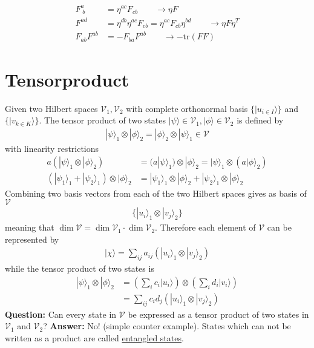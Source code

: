 \documentclass[../main.tex]{subfiles}
\begin{document}
\begin{align}
F^a_{\;b}&=\eta^{ac}F_{cb}\qquad\rightarrow \eta F\\
F^{ad}&=\eta^{db}\eta^{ac}F_{cb}=\eta^{ac}F_{cb}\eta^{bd}\qquad\rightarrow \eta F\eta^T\\
F_{ab}F^{ab}&=-F_{ba}F^{ab}\qquad\rightarrow-\text{tr}(F F)
\end{align}


\section{Tensorproduct}
Given two Hilbert spaces $\mathcal{V}_1, \mathcal{V}_2$ with complete orthonormal basis $\{|u_{i\in I}\rangle\}$ and $\{|v_{k\in K}\rangle\}$. The tensor product of two states $|\psi\rangle\in\mathcal{V}_1, |\phi\rangle\in\mathcal{V}_2$
is defined by
\begin{align}
|\psi\rangle_1 \otimes |\phi\rangle_2= |\phi\rangle_2 \otimes |\psi\rangle_1\in \mathcal{V}
\end{align}
with linearity restrictions
\begin{align}
a(|\psi\rangle_1 \otimes |\phi\rangle_2)
&=(a|\psi\rangle_1) \otimes |\phi\rangle_2
=|\psi\rangle_1 \otimes (a|\phi\rangle_2)\\
(|\psi_1\rangle_1 + |\psi_2\rangle_1)\otimes|\phi\rangle_2
&=|\psi_1\rangle_1\otimes|\phi\rangle_2 + |\psi_2\rangle_1\otimes|\phi\rangle_2
\end{align}
Combining two basis vectors from each of the two Hilbert spaces gives as basis of $\mathcal{V}$
\begin{align}
\{|u_i\rangle_1\otimes|v_j\rangle_2\}
\end{align}
meaning that $\dim \mathcal{V}=\dim \mathcal{V}_1\cdot\dim \mathcal{V}_2$.
Therefore each element of $\mathcal{V}$ can be represented by
\begin{align}
|\chi\rangle=\sum_{ij}a_{ij}(|u_i\rangle_1\otimes|v_j\rangle_2)
\end{align}
while the tensor product of two states is
\begin{align}
|\psi\rangle_1 \otimes |\phi\rangle_2
&=\left(\sum_ic_i|u_i\rangle\right)\otimes\left(\sum_id_i|v_i\rangle\right)\\
&=\sum_{ij}c_id_j(|u_i\rangle_1\otimes|v_j\rangle_2)
\end{align}
{\bf Question:} Can every state in $\mathcal{V}$ be expressed as a tensor product of two states in $\mathcal{V}_1$ and $\mathcal{V}_2$? {\bf Answer:} No!  (simple counter example). States which can not be  written as a product are called \underline{entangled  states}.
\end{document}
